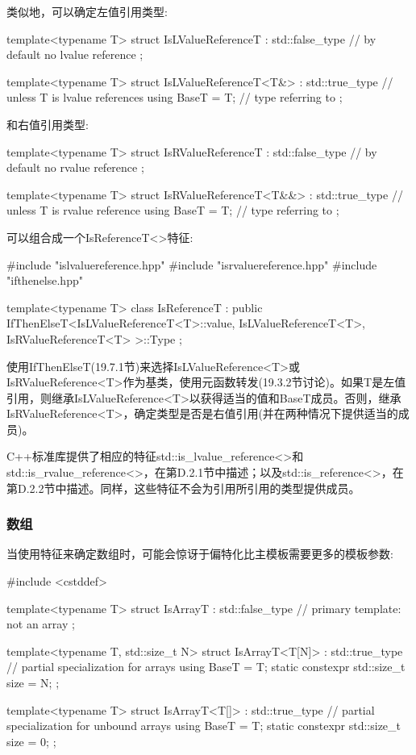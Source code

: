 类似地，可以确定左值引用类型:

\begin{cpp}
template<typename T>
struct IsLValueReferenceT : std::false_type { // by default no lvalue reference
};

template<typename T>
struct IsLValueReferenceT<T&> : std::true_type { // unless T is lvalue references
	using BaseT = T; // type referring to
};
\end{cpp}

和右值引用类型:

\begin{cpp}
template<typename T>
struct IsRValueReferenceT : std::false_type { // by default no rvalue reference
};

template<typename T>
struct IsRValueReferenceT<T&&> : std::true_type { // unless T is rvalue reference
	using BaseT = T; // type referring to
};
\end{cpp}

可以组合成一个IsReferenceT<>特征:

\begin{cpp}
#include "islvaluereference.hpp"
#include "isrvaluereference.hpp"
#include "ifthenelse.hpp"

template<typename T>
class IsReferenceT
	: public IfThenElseT<IsLValueReferenceT<T>::value,
						IsLValueReferenceT<T>,
						IsRValueReferenceT<T>
	>::Type {
};
\end{cpp}

使用IfThenElseT(19.7.1节)来选择IsLValueReference<T>或IsRValueReference<T>作为基类，使用元函数转发(19.3.2节讨论)。如果T是左值引用，则继承IsLValueReference<T>以获得适当的值和BaseT成员。否则，继承IsRValueReference<T>，确定类型是否是右值引用(并在两种情况下提供适当的成员)。

C++标准库提供了相应的特征std::is\_lvalue\_reference<>和std::is\_rvalue\_reference<>，在第D.2.1节中描述；以及std::is\_reference<>，在第D.2.2节中描述。同样，这些特征不会为引用所引用的类型提供成员。

\subsubsection{数组}

当使用特征来确定数组时，可能会惊讶于偏特化比主模板需要更多的模板参数:

\begin{cpp}
#include <cstddef>

template<typename T>
struct IsArrayT : std::false_type { // primary template: not an array
};

template<typename T, std::size_t N>
struct IsArrayT<T[N]> : std::true_type { // partial specialization for arrays
	using BaseT = T;
	static constexpr std::size_t size = N;
};

template<typename T>
struct IsArrayT<T[]> : std::true_type { // partial specialization for unbound arrays
	using BaseT = T;
	static constexpr std::size_t size = 0;
};
\end{cpp}


